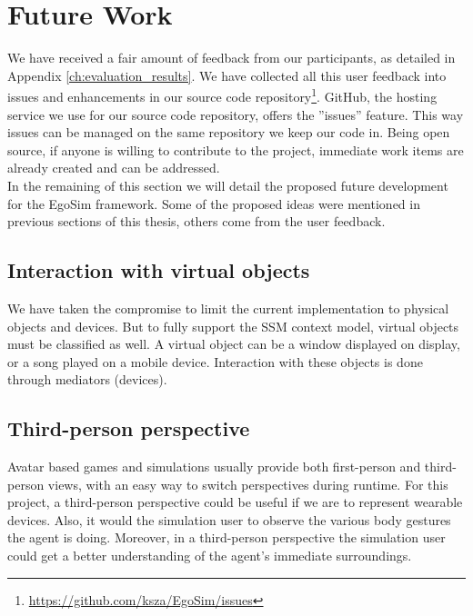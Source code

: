 \section{Future Work} %
\label{sec:future_work}
We have received a fair amount of feedback from our participants, as detailed in Appendix \ref{ch:evaluation_results}. We have collected all this user feedback into issues and enhancements in our source code repository\footnote{\url{https://github.com/ksza/EgoSim/issues}}. GitHub, the hosting service we use for our source code repository, offers the ''issues'' feature. This way issues can be managed on the same repository we keep our code in. Being open source, if anyone is willing to contribute to the project, immediate work items are already created and can be addressed.\\

In the remaining of this section we will detail the proposed future development for the EgoSim framework. Some of the proposed ideas were mentioned in previous sections of this thesis, others come from the user feedback.\\

\subsection{Interaction with virtual objects} 
We have taken the compromise to limit the current implementation to physical objects and devices. But to fully support the SSM context model, virtual objects must be classified as well. A virtual object can be a window displayed on display, or a song played on a mobile device. Interaction with these objects is done through mediators (devices).

\subsection{Third-person perspective} 
Avatar based games and simulations usually provide both first-person and third-person views, with an easy way to switch perspectives during runtime. For this project, a third-person perspective could be useful if we are to represent wearable devices. Also, it would the simulation user to observe the various body gestures the agent is doing. Moreover, in a third-person perspective the simulation user could get a better understanding of the agent's immediate surroundings.

